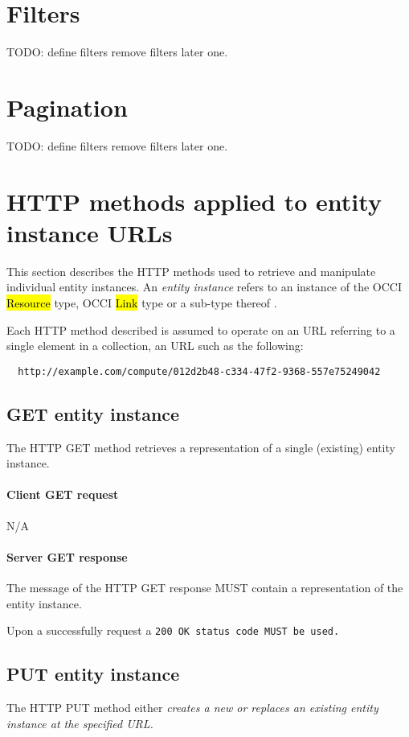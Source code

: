 \documentclass[10pt,a4paper]{article}
\begin{document}
\section{Filters}

TODO: define filters
remove filters later one.

\section{Pagination}

TODO: define filters
remove filters later one.

\section{HTTP methods applied to entity instance URLs}


This section describes the HTTP methods used to retrieve and manipulate
individual entity instances. An {\em entity instance} refers to an instance
of the OCCI \hl{Resource} type, OCCI \hl{Link} type or a sub-type thereof
\cite{occi:core}.

Each HTTP method described is assumed to operate
on an URL referring to a single element in a collection, an URL such as the
following:
\begin{verbatim}
  http://example.com/compute/012d2b48-c334-47f2-9368-557e75249042
\end{verbatim}

\subsection{GET entity instance}
The HTTP GET method retrieves a representation of a single (existing) entity instance.

\paragraph{Client GET request}
N/A

\paragraph{Server GET response}
The message of the HTTP GET response MUST contain a representation of the entity instance.

Upon a successfully request a \tt{200 OK} status code MUST be used.

\subsection{PUT entity instance}
The HTTP PUT method either \em{creates} a new or \em{replaces} an existing entity instance at the specified URL.
\end{document}
